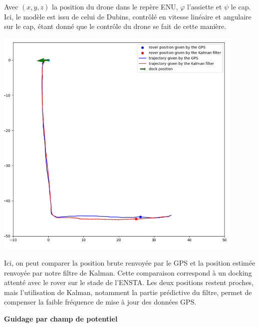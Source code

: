 \documentclass[portrait,final,a0paper,fontscale=0.3]{baposter}
\begin{document}
\begin{poster}
{	Avec $(x,y,z)$ la position du drone dans le repère ENU, $\varphi$ l'assiette et $\psi$ le cap. Ici,
	le modèle est issu de celui de Dubins, contrôlé en vitesse linéaire et angulaire sur le cap, étant
	donné que le contrôle du drone se fait de cette manière.
	
	\begin{minipage}[t]{0.49\textwidth}
		\vspace{-0.1cm}
		\begin{center}
			\includegraphics[width=0.9\textwidth]{GPSvsKalman.png}
		\end{center}
	\end{minipage}\hfill
	\begin{minipage}[t]{0.49\textwidth}
		\vspace{-0.1cm}
		Ici, on peut comparer la position brute renvoyée par le GPS et
		la position estimée renvoyée par notre filtre de Kalman. Cette comparaison
		correspond à un docking attenté avec le rover sur le stade de l'ENSTA.\linebreak
		Les deux positions restent proches, mais l'utilisation de Kalman, notamment la partie
		prédictive du filtre, permet de compenser la faible fréquence de mise à jour des
		données GPS.
	\end{minipage}\hfill


    \vspace{\baselineskip}
	
	\begin{center}
		\textbf{Guidage par champ de potentiel}
	\end{center}
	\vspace{-0.3cm}

}
\end{poster}
\end{document}
